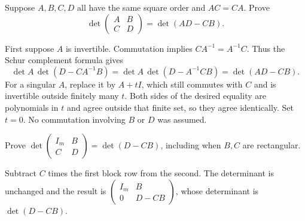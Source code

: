 \begin{problem}\label{ex:07:commuting-blocks}
Suppose \(A,B,C,D\) all have the same square order and \(AC=CA\).
Prove
\[
 \det\begin{pmatrix}A&B\\C&D\end{pmatrix}=\det(AD-CB).
\]
\end{problem}
\begin{solution}
First suppose \(A\) is invertible. Commutation implies
\(CA^{-1}=A^{-1}C\). Thus the Schur complement formula gives
\[
 \det A\,\det(D-CA^{-1}B)
 =\det A\,\det(D-A^{-1}CB)=\det(AD-CB).
\]
For a singular \(A\), replace it by \(A+tI\), which still commutes with
\(C\) and is invertible outside finitely many \(t\).
Both sides of the desired equality are polynomials in \(t\) and agree
outside that finite set, so they agree identically. Set \(t=0\).
No commutation involving \(B\) or \(D\) was assumed.
\end{solution}

\begin{problem}\label{ex:07:identity-block}
Prove
\(\det\begin{pmatrix}I_m&B\\C&D\end{pmatrix}=\det(D-CB)\),
including when \(B,C\) are rectangular.
\end{problem}
\begin{solution}
Subtract \(C\) times the first block row from the second.
The determinant is unchanged and the result is
\(\begin{pmatrix}I_m&B\\0&D-CB\end{pmatrix}\), whose determinant is
\(\det(D-CB)\).
\end{solution}

